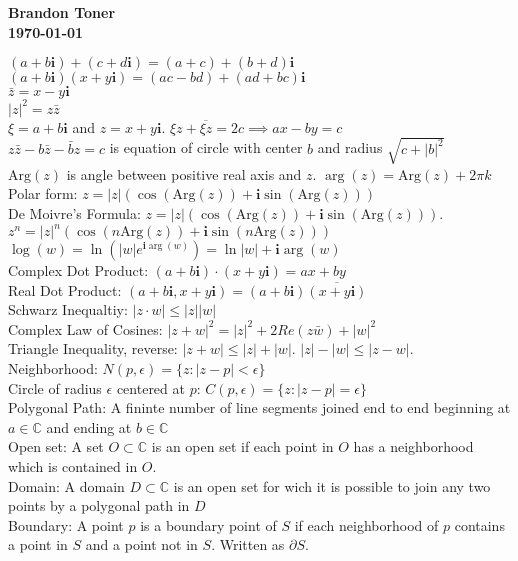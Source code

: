 \documentclass{article}%
\newcommand\abs[1]{\left|#1\right|}
\newcommand\I{\textbf{i}}
\newcommand\Arg[1]{\text{Arg}#1}
\begin{document}
\begin{flushright}
\textbf{Brandon Toner \\
\today}
\end{flushright}


$(a + b\I)+(c+d\I) = (a+c) + (b+d)\I$ \\
$(a + b\I) (x+y\I) = (ac-bd) + (ad+bc)\I$ \\
$\bar{z} = x - y\I$ \\
$\abs{z}^2 = z \bar{z}$ \\
$\xi=a+b\I$ and $z=x+y\I$. $\xi z + \overline{\xi z} = 2c \implies ax - by=c$ \\
$z \bar{z}-b\bar{z}-\bar{b}z = c$ is equation of circle with center $b$ and radius $\sqrt{c+\abs{b}^2}$ \\
$\Arg(z)$ is angle between positive real axis and $z$. $\arg(z)=\Arg(z) + 2 \pi k$\\
Polar form: $z=\abs{z}(\cos(\Arg(z))+\I\sin(\Arg(z)))$\\
De Moivre's Formula: $z=\abs{z}(\cos(\Arg(z)) + \I \sin(\Arg(z)))$. $z^n = \abs{z}^n(\cos(n\Arg(z)) + \I \sin(n\Arg(z)))$ \\
$\log(w) = \ln(\abs{w}e^{\I \arg(w)}) = \ln{\abs{w}} + \I \arg(w)$ \\
Complex Dot Product: $(a+b\I)\cdot(x+y\I) = ax+by$ \\
Real Dot Product: $(a+b\I, x+y\I) = (a+b\I)\overline{(x+y\I)}$ \\
Schwarz Inequaltiy: $\abs{z\cdot w} \leq \abs{z}\abs{w}$ \\
Complex Law of Cosines: $\abs{z+w}^2 = \abs{z}^2+2Re(z\bar{w})+\abs{w}^2$ \\
Triangle Inequality, reverse: $\abs{z+w} \leq \abs{z} + \abs{w}$. $\abs{z}-\abs{w} \leq \abs{z-w}$. \\
Neighborhood: $N(p, \epsilon) = \{z:\abs{z-p} < \epsilon\}$ \\
Circle of radius $\epsilon$ centered at $p$: $C(p, \epsilon)=\{z:\abs{z-p}=\epsilon\}$\\
Polygonal Path: A fininte number of line segments joined end to end beginning at $a \in \mathbb{C}$ and ending at $b \in \mathbb{C}$ \\
Open set: A set $O \subset \mathbb{C}$ is an open set if each point in $O$ has a neighborhood which is contained in $O$. \\
Domain: A domain $D \subset \mathbb{C}$ is an open set for wich it is possible to join any two points by a polygonal path in $D$ \\
Boundary: A point $p$ is a boundary point of $S$ if each neighborhood of $p$ contains a point in $S$ and a point not in $S$. Written as $\partial S$.
\end{document}

